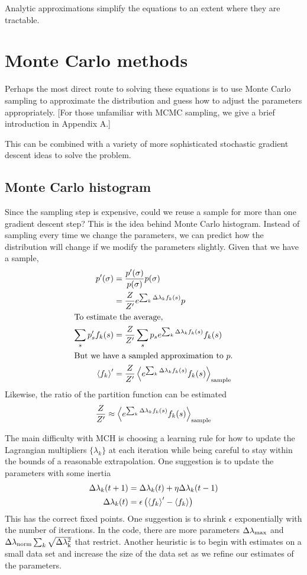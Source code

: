 \documentclass[aps,prl,twocolumn]{revtex4-1}
\begin{document}
Analytic approximations simplify the equations to an extent where they are tractable.

\section{Monte Carlo methods}
Perhaps the most direct route to solving these equations is to use Monte Carlo sampling to approximate the distribution and guess how to adjust the parameters appropriately. [For those unfamiliar with MCMC sampling, we give a brief introduction in Appendix A.]

This can be combined with a variety of more sophisticated stochastic gradient descent ideas to solve the problem.

\subsection{Monte Carlo histogram}
Since the sampling step is expensive, could we reuse a sample for more than one gradient descent step? This is the idea behind Monte Carlo histogram. Instead of sampling every time we change the parameters, we can predict how the distribution will change if we modify the parameters slightly. Given that we have a sample,
\begin{align}
	p'(\sigma) &= \frac{p'(\sigma)}{p(\sigma)}p(\sigma)\\
		&= \frac{Z}{Z'}e^{\sum_k \Delta\lambda_k f_k(s)} p\\
\intertext{To estimate the average,}
	\sum_s p_s' f_k(s) &= \frac{Z}{Z'} \sum_s p_s e^{\sum_k \Delta\lambda_k f_k(s)} f_k(s)\\
\intertext{But we have a sampled approximation to $p$.}
	\left<f_k\right>' &= \frac{Z}{Z'} \left<e^{\sum_k \Delta\lambda_k f_k(s)} f_k(s)\right>_{\rm sample}
\end{align}
Likewise, the ratio of the partition function can be estimated
\begin{align}
	\frac{Z}{Z'} \approx \left<e^{\sum_k \Delta\lambda_k f_k(s)}f_k(s)\right>_{\rm sample}
\end{align}

The main difficulty with MCH is choosing a learning rule for how to update the Lagrangian multipliers $\{\lambda_k\}$ at each iteration while being careful to stay within the bounds of a reasonable extrapolation. One suggestion is to update the parameters with some inertia
\begin{align}
	\Delta\lambda_k(t+1) &= \Delta \lambda_k(t) + \eta \Delta\lambda_k(t-1)\\
	\Delta \lambda_k(t) &= \epsilon\left(\left<f_k\right>'-\left<f_k\right>\right)
\end{align}
This has the correct fixed points. One suggestion is to shrink $\epsilon$ exponentially with the number of iterations. In the code, there are more parameters $\Delta\lambda_{\rm max}$ and $\Delta\lambda_{\rm norm}\sum_k \sqrt{\Delta\lambda_{\rm k}^2}$ that restrict. Another heuristic is to begin with estimates on a small data set and increase the size of the data set as we refine our estimates of the parameters.
\end{document}
